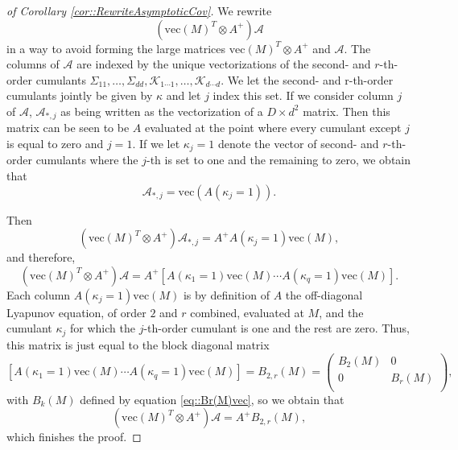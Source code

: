 \documentclass{biometrika}
\begin{document}
\begin{proof}[of Corollary \ref{cor::RewriteAsymptoticCov}]
We rewrite
$$\left(\mathrm{vec}(M)^T \otimes A^{+} \right) \mathcal{A}$$
in a way to avoid forming the large matrices $\mathrm{vec}(M)^T \otimes A^{+}$ and $\mathcal{A}$. The columns of $\mathcal{A}$ are indexed by the unique vectorizations of the second- and $r$-th-order cumulants $\Sigma_{11}, \dots, \Sigma_{dd}, \mathcal{K}_{1 \cdots 1}, \dots, \mathcal{K}_{d \cdots d}$. We let the second- and r-th-order cumulants jointly be given by $\kappa$ and let $j$ index this set. If we consider column $j$ of $\mathcal{A}$, $\mathcal{A}_{*,j}$ as being written as the vectorization of a $D \times d^2$ matrix. Then this matrix 
can be seen to be $A$ evaluated at the point where 
every cumulant except $j$ is equal to zero and $j = 1$. If we let $\kappa_j = 1$ denote the vector of second- and $r$-th-order cumulants where the $j$-th is set to one and the remaining to zero, we obtain that 
$$\mathcal{A}_{*,j} = \mathrm{vec} (A(\kappa_j = 1)).$$

Then 
\begin{equation*}
    \left(\mathrm{vec}(M)^T \otimes A^{+} \right) \mathcal{A}_{*,j} = A^{+} A(\kappa_j = 1) \text{vec}(M),
\end{equation*}
and therefore, 
\begin{equation*}
    \left(\mathrm{vec}(M)^T \otimes A^{+} \right) \mathcal{A}  = A^{+} \left[ A(\kappa_1 = 1) \mathrm{vec}(M) \cdots A(\kappa_q = 1) \mathrm{vec}(M) \right]. 
\end{equation*}
Each column $A(\kappa_j = 1) \mathrm{vec}(M)$ is by definition of $A$ the off-diagonal Lyapunov equation, of order $2$ and $r$ combined, evaluated at $M$, and the cumulant $\kappa_j$ for which the $j$-th-order cumulant is one and the rest are zero. Thus, this matrix is just equal to the block diagonal matrix
\begin{equation*}
    \left[ A(\kappa_1 = 1) \mathrm{vec}(M) \cdots A(\kappa_q = 1) \mathrm{vec}(M) \right] = B_{2,r}(M) = \begin{pmatrix}
        B_2(M) & 0 \\
        0 & B_r(M) \\
    \end{pmatrix},
\end{equation*}
with $B_k(M)$ defined by equation \eqref{eq::Br(M)vec}, so we obtain that 
\begin{equation*}
\left(\mathrm{vec}(M)^T \otimes A^{+} \right) \mathcal{A} = A^{+} B_{2,r}(M),
\end{equation*}
which finishes the proof. 
\end{proof}
\end{document}
